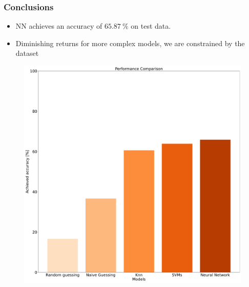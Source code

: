 \documentclass[8pt]{beamer}
\begin{document}
\begin{frame}
\frametitle{Conclusions}
  \begin{itemize}
          \item NN achieves an accuracy of $\SI{65.87}{\percent}$ on test data.
          \item Diminishing returns for more complex models, we are constrained by the dataset
  \end{itemize}
  \begin{figure}
    \centering
    \includegraphics[scale=0.15]{figures/performance-comparison.pdf}
  \end{figure}
\end{frame}


\printbibliography
\end{document}
